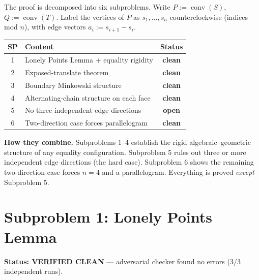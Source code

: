 \documentclass[12pt,a4paper]{article}
\theoremstyle{definition}
\begin{document}
The proof is decomposed into six subproblems.  Write $P:=\operatorname{conv}(S)$,
$Q:=\operatorname{conv}(T)$.  Label the vertices of $P$ as $s_1,\ldots,s_n$
counterclockwise (indices mod $n$), with edge vectors $a_i:=s_{i+1}-s_i$.

\medskip
\begin{center}
\renewcommand{\arraystretch}{1.4}
\begin{tabular}{clc}
\toprule
\textbf{SP} & \textbf{Content} & \textbf{Status}\\
\midrule
1 & Lonely Points Lemma + equality rigidity & \textcolor{green!60!black}{\textbf{clean}}\\
2 & Exposed-translate theorem & \textcolor{green!60!black}{\textbf{clean}}\\
3 & Boundary Minkowski structure & \textcolor{green!60!black}{\textbf{clean}}\\
4 & Alternating-chain structure on each face & \textcolor{green!60!black}{\textbf{clean}}\\
5 & No three independent edge directions & \textcolor{red!70!black}{\textbf{open}}\\
6 & Two-direction case forces parallelogram & \textcolor{green!60!black}{\textbf{clean}}\\
\bottomrule
\end{tabular}
\end{center}

\bigskip
\noindent\textbf{How they combine.}
Subproblems 1--4 establish the rigid algebraic--geometric structure of any equality
configuration.  Subproblem 5 rules out three or more independent edge directions
(the hard case).  Subproblem 6 shows the remaining two-direction case forces
$n=4$ and a parallelogram.  Everything is proved \emph{except} Subproblem 5.

\section{Subproblem 1: Lonely Points Lemma}

\begin{cleanenv}
\textbf{Status: VERIFIED CLEAN} --- adversarial checker found no errors (3/3 independent runs).
\end{cleanenv}
\end{document}
